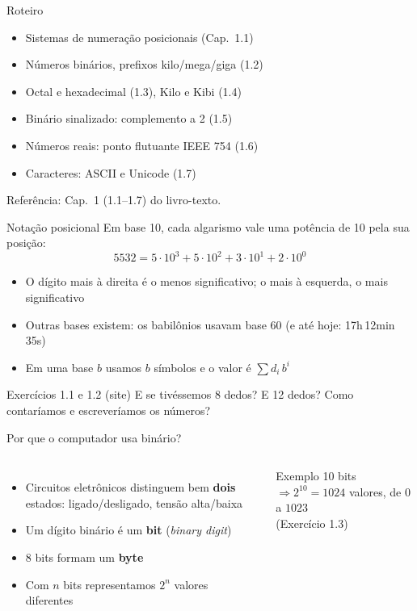 \documentclass[aspectratio=169,10pt,t]{beamer}
\begin{document}
\capa

\begin{frame}{Roteiro}
  \begin{itemize}
    \item Sistemas de numeração posicionais (Cap.~1.1)
    \item Números binários, prefixos kilo/mega/giga (1.2)
    \item Octal e hexadecimal (1.3), Kilo e Kibi (1.4)
    \item Binário sinalizado: complemento a 2 (1.5)
    \item Números reais: ponto flutuante IEEE 754 (1.6)
    \item Caracteres: ASCII e Unicode (1.7)
  \end{itemize}
  \vfill{\footnotesize Referência: Cap.~1 (1.1--1.7) do livro-texto.}
\end{frame}

\begin{frame}{Notação posicional}
  Em base 10, cada algarismo vale uma potência de 10 pela sua posição:
  \[
    5532 = 5\cdot10^3 + 5\cdot10^2 + 3\cdot10^1 + 2\cdot10^0
  \]
  \begin{itemize}
    \item O dígito mais à direita é o \alert{menos significativo}; o mais à esquerda, o \alert{mais significativo}
    \item Outras bases existem: os babilônios usavam base 60 (e até hoje: 17h\,12min\,35s)
    \item Em uma base \(b\) usamos \(b\) símbolos e o valor é \(\sum d_i\, b^i\)
  \end{itemize}
  \begin{exampleblock}{Exercícios 1.1 e 1.2 (site)}
    E se tivéssemos 8 dedos? E 12 dedos? Como contaríamos e escreveríamos os números?
  \end{exampleblock}
\end{frame}

\begin{frame}{Por que o computador usa binário?}
  \begin{columns}[T]
    \begin{itemize}
      \item Circuitos eletrônicos distinguem bem \textbf{dois} estados: ligado/desligado, tensão alta/baixa
      \item Um dígito binário é um \textbf{bit} (\emph{binary digit})
      \item 8 bits formam um \textbf{byte}
      \item Com \(n\) bits representamos \(2^n\) valores diferentes
    \end{itemize}
    \begin{block}{Exemplo}
      10 bits \(\Rightarrow 2^{10}=1024\) valores, de \(0\) a \(1023\)\\[1ex]
      {\footnotesize (Exercício 1.3)}
    \end{block}
  \end{columns}
\end{frame}
\end{document}
